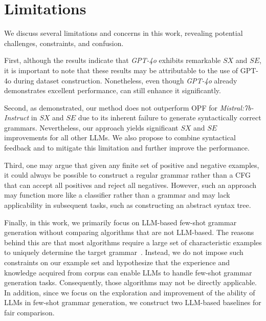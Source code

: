 \section{Limitations}
\label{sec:limitations}
We discuss several limitations and concerns in this work, revealing potential challenges, constraints, and confusion. 


First, although the results indicate that \textit{GPT-4o} exhibits remarkable $SX$ and $SE$, it is important to note that these results may be attributable to the use of GPT-4o during dataset construction. Nonetheless, even though \textit{GPT-4o} already demonstrates excellent performance, \NAME can still enhance it significantly.

Second, as demonstrated, our method does not outperform OPF for \textit{Mistral:7b-Instruct} in $SX$ and $SE$ due to its inherent failure to generate syntactically correct grammars. Nevertheless, our approach yields significant $SX$ and $SE$ improvements for all other LLMs. We also propose to combine syntactical feedback and \NAME to mitigate this limitation and further improve the performance.

Third, one may argue that given any finite set of positive and negative examples, it could always be possible to construct a regular grammar rather than a CFG that can accept all positives and reject all negatives. However, such an approach may function more like a classifier rather than a grammar and may lack applicability in subsequent tasks, such as constructing an abstract syntax tree. 

Finally, in this work, we primarily focus on LLM-based few-shot grammar generation without comparing algorithms that are not LLM-based. The reasons behind this are that most algorithms require a large set of characteristic examples to uniquely determine the target grammar~\cite{de2010grammatical}. Instead, we do not impose such constraints on our example set and hypothesize that the experience and knowledge acquired from corpus can enable LLMs to handle few-shot grammar generation tasks. Consequently, those algorithms may not be directly applicable. In addition, since we focus on the exploration and improvement of the ability of LLMs in few-shot grammar generation, we construct two LLM-based baselines for fair comparison. 
